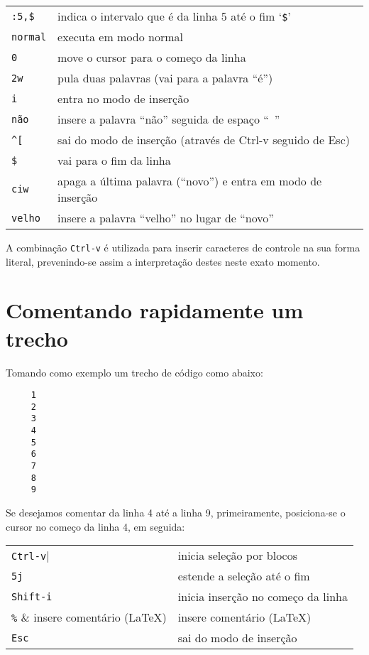 \begin{table}[htb]\begin{center} \begin{tabular}{ll} \hline
     \verb|:5,$| &  indica o intervalo que é da linha 5 até o fim `\verb|$|'\\
     \verb|normal| &  executa em modo normal\\
     \verb|0| &  move o cursor para o começo da linha\\
     \verb|2w| &  pula duas palavras (vai para a palavra ``é'')\\
     \verb|i| &  entra no modo de inserção\\
     \verb|não | &  insere a palavra ``não'' seguida de espaço ``~''\\
     \verb|^[| & sai do modo de inserção (através de Ctrl-v seguido de Esc)\\
     \verb|$| &  vai para o fim da linha\\
     \verb|ciw| &  apaga a última palavra (``novo'') e entra em modo de inserção\\
     \verb|velho| &  insere a palavra ``velho'' no lugar de ``novo''\\
\hline \end{tabular}\end{center}\end{table}

A combinação \verb|Ctrl-v| é utilizada para inserir caracteres de controle na
sua forma literal, prevenindo-se assim a interpretação destes neste exato
momento.

\section{Comentando rapidamente um trecho}

Tomando como exemplo um trecho de código como abaixo:

\begin{verbatim}
     1   
     2   
     3   
     4   
     5   
     6   
     7   
     8   
     9   
\end{verbatim}

Se desejamos comentar da linha 4 até a linha 9, primeiramente, 
posiciona-se o cursor no começo da linha 4, em seguida:
\begin{table}[htb]\begin{center} \begin{tabular}{ll} \hline
     \verb|Ctrl-v|| &  inicia seleção por blocos\\
     \verb|5j| & estende a seleção até o fim\\
     \verb|Shift-i| & inicia inserção no começo da linha\\
     \verb|%| & insere comentário (\LaTeX)\\
     \verb|Esc| & sai do modo de inserção\\
\hline \end{tabular}\end{center}\end{table}

